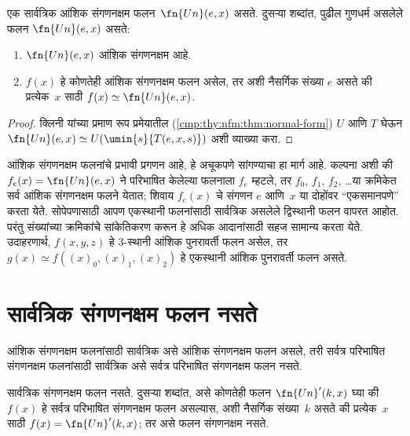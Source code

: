 \begin{thm}
\label{cmp:thy:uni:thm:univ-comp}
एक सार्वत्रिक आंशिक संगणनक्षम फलन~$\fn{Un}(e,x)$ असते. दुसऱ्या
शब्दांत, पुढील गुणधर्म असलेले फलन $\fn{Un}(e,x)$ असते:
\begin{enumerate}
\item $\fn{Un}(e,x)$ आंशिक संगणनक्षम आहे.
\item $f(x)$ हे कोणतेही आंशिक संगणनक्षम फलन असेल, तर अशी नैसर्गिक
संख्या $e$ असते की प्रत्येक~$x$ साठी $f(x) \simeq \fn{Un}(e,x)$.
\end{enumerate}
\end{thm}

\begin{proof}
क्लिनी यांच्या प्रमाण रूप प्रमेयातील (\ref{cmp:thy:nfm:thm:normal-form})
$U$ आणि $T$ घेऊन $\fn{Un}(e,x) \simeq U(\umin{s}{T(e,x,s)})$
अशी व्याख्या करा.
\end{proof}

\begin{explain}
आंशिक संगणनक्षम फलनांचे प्रभावी प्रगणन आहे, हे अचूकपणे सांगण्याचा
हा मार्ग आहे. कल्पना अशी की $f_e(x) = \fn{Un}(e,x)$ ने परिभाषित
केलेल्या फलनाला $f_e$ म्हटले, तर $f_0$, $f_1$, $f_2$, \dots या
क्रमिकेत सर्व आंशिक संगणनक्षम फलने येतात; शिवाय $f_e(x)$ चे
संगणन $e$ आणि~$x$ या दोहोंवर ``एकसमानपणे'' करता येते. सोपेपणासाठी
आपण एकस्थानी फलनांसाठी सार्वत्रिक असलेले द्विस्थानी फलन वापरत आहोत.
परंतु संख्यांच्या क्रमिकांचे सांकेतिकरण करून हे अधिक आदानांसाठी सहज
सामान्य करता येते. उदाहरणार्थ, $f(x,y,z)$ हे $3$-स्थानी आंशिक
पुनरावर्ती फलन असेल, तर $g(x) \simeq f((x)_0, (x)_1, (x)_2)$
हे एकस्थानी आंशिक पुनरावर्ती फलन असते.

\end{explain}











\section{सार्वत्रिक संगणनक्षम फलन नसते}\label{cmp:thy:nou:sec}

आंशिक संगणनक्षम फलनांसाठी सार्वत्रिक असे आंशिक संगणनक्षम फलन असले,
तरी सर्वत्र परिभाषित संगणनक्षम फलनांसाठी सार्वत्रिक असे सर्वत्र
परिभाषित संगणनक्षम फलन नसते.


\begin{thm}
\label{cmp:thy:nou:thm:no-univ}
सार्वत्रिक संगणनक्षम फलन नसते. दुसऱ्या शब्दांत, असे कोणतेही
फलन $\fn{Un}'(k, x)$ घ्या की $f(x)$ हे सर्वत्र परिभाषित संगणनक्षम
फलन असल्यास, अशी नैसर्गिक संख्या~$k$ असते की प्रत्येक~$x$ साठी
$f(x) = \fn{Un}'(k,x)$; तर असे फलन संगणनक्षम नसते.
\end{thm}

